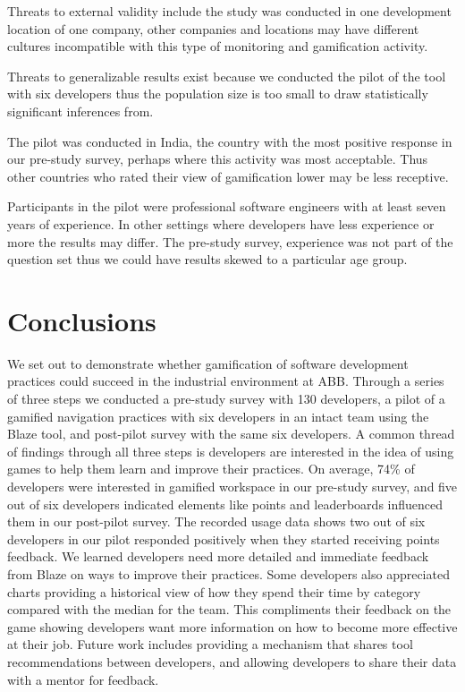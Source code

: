 \documentclass{sig-alternate}
\begin{document}
Threats to external validity include the study was conducted in one development location of one company, other companies and locations may have different cultures incompatible with this type of monitoring and gamification activity.

 Threats to generalizable results exist because we conducted the pilot of the tool with six developers thus the population size is too small to draw statistically significant inferences from. 

 The pilot was conducted in India, the country with the most positive response in our pre-study survey, perhaps where this activity was most acceptable.  Thus other countries who rated their view of gamification lower may be less receptive. 

Participants in the pilot were professional software engineers with at least seven years of experience.  In other settings where developers have less experience or more the results may differ.  The pre-study survey, experience was not part of the question set thus we could have results skewed to a particular age group.

\section{Conclusions}
We set out to demonstrate whether gamification of software development practices could succeed in the industrial environment at ABB.  Through a series of three steps we conducted a pre-study survey with 130 developers, a pilot of a gamified navigation practices with six developers in an intact team using the Blaze tool, and post-pilot survey with the same six developers.  A common thread of findings through all three steps is developers are interested in the idea of using games to help them learn and improve their practices.  On average, 74\% of developers were interested in gamified workspace in our pre-study survey, and five out of six developers indicated elements like points and leaderboards influenced them in our post-pilot survey.  The recorded usage data shows two out of six developers in our pilot responded positively when they started receiving points feedback.  We learned developers need more detailed and immediate feedback from Blaze on ways to improve their practices.  Some developers also appreciated charts providing a historical view of how they spend their time by category compared with the median for the team.  This compliments their feedback on the game showing developers want more information on how to become more effective at their job.  Future work includes providing a mechanism that shares tool recommendations between developers, and allowing developers to share their data with a mentor for feedback.
\end{document}
